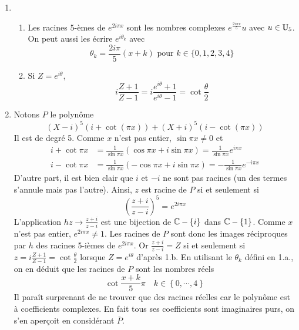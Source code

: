 \begin{enumerate}
\item 
\begin{enumerate}
 \item Les racines 5-èmes de $e^{2i\pi x}$ sont les nombres complexes $e^{\frac{2i\pi x}{5}}u$ avec $u\in \mathbb{U}_5$. On peut aussi les écrire $e^{i\theta_k}$ avec 
\begin{displaymath}
 \theta_k = \frac{2i\pi}{5} (x+k) \text{ pour } k\in \{0,1,2,3,4\}
\end{displaymath}
 
 \item Si $Z=e^{i\theta }$, 
\begin{displaymath}
i\frac{Z+1}{Z-1}=i\frac{e^{i\theta }+1}{e^{i\theta }-1}=\cot \frac{\theta }{2} 
\end{displaymath}
\end{enumerate}

\item  Notons $P$ le polynôme 
\begin{displaymath}
 (X-i)^{5}(i+\cot (\pi x))+(X+i)^{5}(i-\cot (\pi x))
\end{displaymath}
Il est de degré 5. Comme $x$ n'est pas entier, $\sin \pi x\neq 0$ et 
\begin{align*}
i+\cot \pi x &= \frac{1}{\sin \pi x}(\cos \pi x+i\sin \pi x)=\frac{1}{\sin \pi x}e^{i\pi x} \\
i-\cot \pi x &= \frac{1}{\sin \pi x}(-\cos \pi x+i\sin \pi x)=-\frac{1}{\sin \pi x}e^{-i\pi x}
\end{align*}
D'autre part, il est bien clair que $i$ et $-i$ ne sont pas racines (un des termes s'annule mais pas l'autre). Ainsi, $z$ est racine de $P$ si et seulement si 
\begin{displaymath}
\left( \frac{z+i}{z-i}\right) ^{5}=e^{2i\pi x} 
\end{displaymath}
L'application $h$\quad $z\rightarrow \frac{z+i}{z-i}$ est une bijection de $\mathbb{C}-\left\{ i\right\} $ dans $\mathbb{C}-\left\{ 1\right\} $. Comme $x $ n'est pas entier, $e^{2i\pi x}\neq 1$. Les racines de $P$ sont donc les images r\'{e}ciproques par $h$ des racines 5-i\`{e}mes de $e^{2i\pi x}$.\newline
Or $\frac{z+i}{z-i}=Z$ si et seulement si $z=i\frac{Z+1}{Z-1}=\cot \frac{\theta }{2}$ lorsque $Z=e^{i\theta }$ d'après 1.b.
En utilisant le $\theta_k$ défini en 1.a., on en déduit que les racines de $P$ sont les nombres r\'{e}els 
\begin{displaymath}
\cot \frac{x+k}{5}\pi \quad k\in \left\{ 0,\cdots ,4\right\} 
\end{displaymath}
Il para\^{i}t surprenant de ne trouver que des racines r\'{e}elles car le polynôme est \`{a} coefficients complexes. En fait tous ses coefficients sont imaginaires purs, on s'en aper\c{c}oit en consid\'{e}rant $\overline{P}$.


\end{enumerate}
